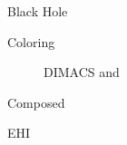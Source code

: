 \begin{description}
	\item[Black Hole]
		\parencite{Gent07}
	\item[Coloring]
		DIMACS and \parencite{Benhamou07}
	\item[Composed]
		\parencite{Lecoutre04}
	\item[EHI]

\end{description}
